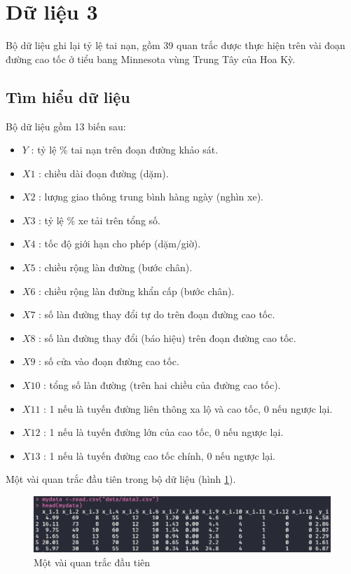 \section{Dữ liệu 3}

Bộ dữ liệu ghi lại tỷ lệ tai nạn, gồm 39 quan trắc được thực hiện trên vài đoạn đường cao tốc ở tiểu bang Minnesota vùng Trung Tây của Hoa Kỳ.

\subsection*{Tìm hiểu dữ liệu}

Bộ dữ liệu gồm 13 biến sau:
\begin{itemize}[label=--]
	\item $Y$ : tỷ lệ \% tai nạn trên đoạn đường khảo sát.
	\item $X1$ : chiều dài đoạn đường (dặm).
	\item $X2$ : lượng giao thông trung bình hàng ngày (nghìn xe).
	\item $X3$ : tỷ lệ \% xe tải trên tổng số.
	\item $X4$ : tốc độ giới hạn cho phép (dặm/giờ).
	\item $X5$ : chiều rộng làn đường (bước chân).
	\item $X6$ : chiều rộng làn đường khẩn cấp (bước chân).
	\item $X7$ : số làn đường thay đổi tự do trên đoạn đường cao tốc.
	\item $X8$ : số làn đường thay đổi (báo hiệu) trên đoạn đường cao tốc.
	\item $X9$ : số cửa vào đoạn đường cao tốc.
	\item $X10$ : tổng số làn đường (trên hai chiều của đường cao tốc).
	\item $X11$ : 1 nếu là tuyến đường liên thông xa lộ và cao tốc, 0 nếu ngược lại.
	\item $X12$ : 1 nếu là tuyến đường lớn của cao tốc, 0 nếu ngược lại.
	\item $X13$ : 1 nếu là tuyến đường cao tốc chính, 0 nếu ngược lại.
\end{itemize}

Một vài quan trắc đầu tiên trong bộ dữ liệu (hình \ref{fig-b3:head-dataset}).
\begin{figure}[H]
	\centering
	\includegraphics[width=0.8\linewidth]{images/B3/head-dataset}
	\caption{Một vài quan trắc đầu tiên}
	\label{fig-b3:head-dataset}
\end{figure}

